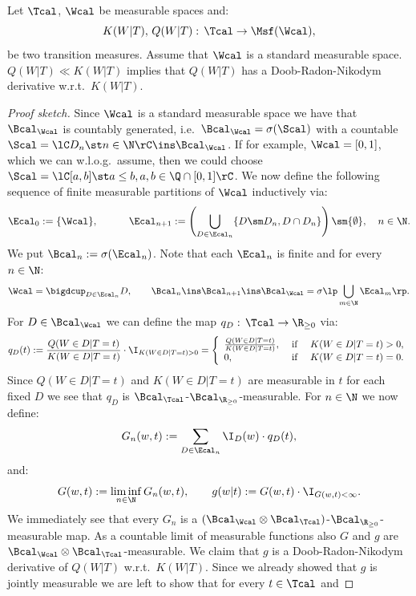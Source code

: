 \begin{Thm}
    Let $\Tcal$, $\Wcal$ be measurable spaces and:
    \[ K(W|T), \,Q(W|T):\, \Tcal \to \Msf(\Wcal),  \]
    be two transition measures. Assume that $\Wcal$ is a standard measurable space.
    $Q(W|T) \ll K(W|T)$ implies that $Q(W|T)$ has a Doob-Radon-Nikodym derivative w.r.t.\ $K(W|T)$.
 \begin{proof}[Proof sketch]
    Since $\Wcal$ is a standard measurable space we have that $\Bcal_\Wcal$ is countably generated, i.e.\
    $\Bcal_\Wcal=\sigma(\Scal)$ with a countable $\Scal=\lC  D_n \st n\in \N \rC \ins \Bcal_\Wcal$. 
    If for example, $\Wcal=[0,1]$, which we can w.l.o.g.\ assume, 
    then we could choose $\Scal =\lC [a,b] \st a \le b, a,b \in \Q \cap [0,1] \rC$. 
    We now define the following sequence of finite measurable partitions of $\Wcal$ inductively via:
     \[ \Ecal_0:=\{\Wcal\}, \qquad\quad \Ecal_{n+1}:= \left(\bigcup_{D\in\Ecal_{n}} \{ D \sm D_n, D \cap D_n \} \right) \sm \{\emptyset\}, \quad n \in \N. \]
     We put $\Bcal_n:=\sigma(\Ecal_n)$.
     Note that each $\Ecal_n$ is finite and for every $n \in \N$:
     \[ \Wcal = \bigdcup_{D \in \Ecal_n} D, \qquad \Bcal_n \ins \Bcal_{n+1} \ins 
     \Bcal_\Wcal = \sigma \lp \bigcup_{m \in \N} \Ecal_m\rp.\]
     For $D \in \Bcal_\Wcal$ we can define the  map $q_D:\, \Tcal \to \R_{\ge 0}$ via:
     \[ q_D(t):=  \frac{Q(W \in D|T=t)}{K(W \in D|T=t)}  \cdot 
     \I_{K(W \in D|T=t)>0}  = \left\{ 
    \begin{array}{lll}
        \frac{Q(W \in D|T=t)}{K(W \in D|T=t)},& \text{ if }& K(W \in D|T=t) > 0,\\
        0, & \text{ if }& K(W \in D|T=t) = 0.
    \end{array}
    \right. \]
    Since $Q(W\in D|T=t)$ and $K(W \in D|T=t)$ are measurable in $t$ for each fixed $D$ we see that $q_D$ is
    $\Bcal_\Tcal$-$\Bcal_{\R_{\ge0}}$-measurable.
     For $n \in \N$ we now define:
     \[ G_n(w,t) := \sum_{D \in \Ecal_n}  \I_D(w) \cdot q_D(t), \]
     and:
     \[ G(w,t) := \liminf_{n\in\N} G_n(w,t), \qquad g(w|t):= G(w,t) \cdot \I_{G(w,t) < \infty}.\]
     We immediately see that every $G_n$ is a $(\Bcal_\Wcal\otimes\Bcal_\Tcal)$-$\Bcal_{\R_{\ge0}}$-measurable map. 
     As a countable limit of measurable functions also $G$ and $g$
     are $\Bcal_\Wcal\otimes\Bcal_\Tcal$-measurable. 
     We claim that $g$ is a Doob-Radon-Nikodym derivative of $Q(W|T)$ w.r.t.\ $K(W|T)$. 
     Since we already showed that $g$ is jointly measurable we are left to show that for every $t \in \Tcal$ and 

\end{proof}
\end{Thm}
